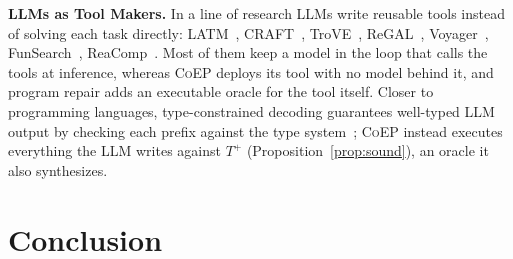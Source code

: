 \documentclass[acmsmall,screen,review,anonymous,nonacm]{acmart}
\newcommand{\tool}{\textsc{CoEP}\xspace}
\begin{document}
\textbf{LLMs as Tool Makers.} In a line of research LLMs write reusable tools instead of solving each task directly: LATM~\cite{cai2024large}, CRAFT~\cite{yuan2024craft}, TroVE~\cite{wang2024trove}, ReGAL~\cite{stengel2024regal}, Voyager~\cite{wang2023voyager}, FunSearch~\cite{romera2024mathematical}, ReaComp~\cite{naik2026reacomp}. Most of them keep a model in the loop that calls the tools at inference, whereas \tool deploys its tool with no model behind it, and program repair adds an executable oracle for the tool itself. Closer to programming languages, type-constrained decoding guarantees well-typed LLM output by checking each prefix against the type system~\cite{mundler2025type}; \tool instead executes everything the LLM writes against $T^{+}$ (Proposition~\ref{prop:sound}), an oracle it also synthesizes.


\section{Conclusion}
\end{document}
